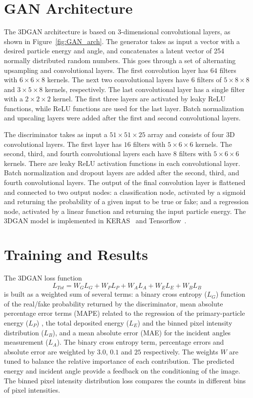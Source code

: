 \section{GAN Architecture}
\label{sec:GANarch}

The 3DGAN architecture is based on 3-dimensional convolutional layers, as shown in Figure~\ref{fig:GAN_arch}. The generator takes as input a vector with a desired particle energy and angle, and concatenates a latent vector of 254 normally distributed random numbers. This goes through a set of alternating upsampling and convolutional layers. The first convolution layer has $64$ filters with $6 \times 6 \times 8$ kernels. The next two convolutional layers have $6$ filters of $5 \times 8 \times 8$ and $3 \times 5 \times 8$ kernels, respectively. The last convolutional layer has a single filter with a $2 \times 2 \times 2$ kernel. The first three layers are activated by leaky ReLU functions, while ReLU functions are used for the last layer. Batch normalization and upscaling layers were added after the first and second convolutional layers.

The discriminator takes as input a $51  \times 51  \times 25$ array and consists of four 3D convolutional layers. The first layer has $16$ filters with $5 \times 6 \times 6$ kernels. The second, third, and fourth convolutional layers each have $8$ filters with $5 \times 6 \times 6$ kernels. There are leaky ReLU activation functions in each convolutional layer. Batch normalization and dropout layers are added after the second, third, and fourth convolutional layers. The output of the final convolution layer is flattened and connected to two output nodes: a classification node, activated by a sigmoid and returning the probability of a given input to be true or fake; and a regression node, activated by a linear function and returning the input particle energy.
The 3DGAN model is implemented in KERAS~\cite{keras} and Tensorflow~\cite{tensorflow2015-whitepaper}. 

\section{Training and Results}
The 3DGAN loss function
\begin{equation}
   L_{Tot}  = W_{G}L_{G} + W_{P}L_{P} + W_{A}L_{A} + W_{E}L_{E} + W_{B}L_{B} 
\label{eq:loss}
\end{equation}
is built as a weighted sum of several terms: a binary cross entropy ($L_{G}$) function of the real/fake probability returned by the discriminator, mean absolute percentage error terms (MAPE) related to the regression of the primary-particle energy ($L_{P}$) , the total deposited energy ($L_{E}$) and the binned pixel intensity distribution ($L_{B}$), and a mean absolute error (MAE) for the incident angles measurement ($L_{A}$). The binary cross entropy term, percentage errors and absolute error are weighted by $3.0$, $0.1$ and $25$ respectively. The weights $W$ are tuned to balance the relative importance of each contribution. The predicted energy and incident angle provide a feedback on the conditioning of the image. The binned pixel intensity distribution loss compares the counts in different bins of pixel intensities. 

